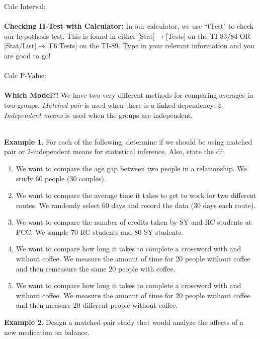 \documentclass[12pt]{amsart}
\theoremstyle{definition}
\newtheorem{ex}{Example}
\begin{document}
Calc Interval:\\
~\\
\noindent \textbf{Checking H-Test with Calculator:} In our calculator, we use ``tTest" to check our hypothesis test. This is found in either [Stat]$\rightarrow$[Tests] on the TI-83/84 OR [Stat/List]$\rightarrow$[F6:Tests] on the TI-89. Type in your relevant information and you are good to go!\\
~\\
Calc P-Value:\\
~\\
\newpage
\noindent \textbf{Which Model?!} We have two very different methods for comparing averages in two groups. \emph{Matched pair} is used when there is a linked dependency. \emph{2-Independent means} is used when the groups are independent.\\
~\\
\begin{ex} For each of the following, determine if we should be using matched pair or 2-independent means for statistical inference. Also, state the df:
 \begin{enumerate}
  \item We want to compare the age gap between two people in a relationship. We study 60 people (30 couples).
  \item We want to compare the average time it takes to get to work for two different routes. We randomly select $60$ days and record the data (30 days each route).
  \item We want to compare the number of credits taken by SY and RC students at PCC. We sample $70$ RC students and $80$ SY students.
  \item We want to compare how long it takes to complete a crossword with and without coffee. We measure the amount of time for $20$ people without coffee and then remeasure the same $20$ people with coffee.
  \item We want to compare how long it takes to complete a crossword with and without coffee. We measure the amount of time for $20$ people without coffee and then measure $20$ different people without coffee.
 \end{enumerate}\end{ex}
\vfill

\begin{ex}
Design a matched-pair study that would analyze the affects of a new medication on balance.
\end{ex}
\vspace{1in}
\end{document}
